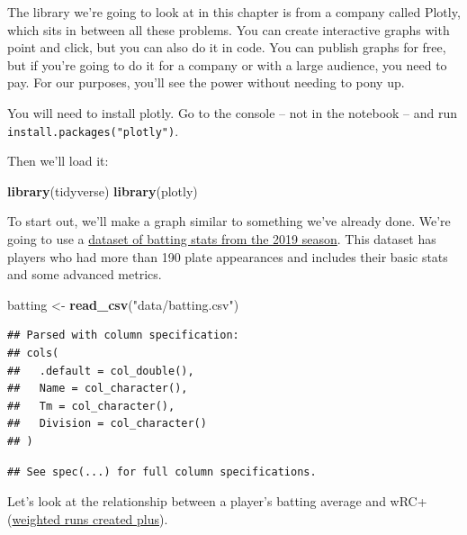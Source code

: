 \documentclass[]{book}
\newenvironment{Shaded}{\begin{snugshade}}{\end{snugshade}}
\newcommand{\KeywordTok}[1]{\textcolor[rgb]{0.13,0.29,0.53}{\textbf{#1}}}
\newcommand{\NormalTok}[1]{#1}
\newcommand{\StringTok}[1]{\textcolor[rgb]{0.31,0.60,0.02}{#1}}
\begin{document}
The library we're going to look at in this chapter is from a company called Plotly, which sits in between all these problems. You can create interactive graphs with point and click, but you can also do it in code. You can publish graphs for free, but if you're going to do it for a company or with a large audience, you need to pay. For our purposes, you'll see the power without needing to pony up.

You will need to install plotly. Go to the console -- not in the notebook -- and run \texttt{install.packages("plotly")}.

Then we'll load it:

\begin{Shaded}
\begin{Highlighting}[]
\KeywordTok{library}\NormalTok{(tidyverse)}
\KeywordTok{library}\NormalTok{(plotly)}
\end{Highlighting}
\end{Shaded}

To start out, we'll make a graph similar to something we've already done. We're going to use a \href{https://unl.box.com/s/xg0eqvmz9ynnegvjabv21ev5qlsd7mjs}{dataset of batting stats from the 2019 season}. This dataset has players who had more than 190 plate appearances and includes their basic stats and some advanced metrics.

\begin{Shaded}
\begin{Highlighting}[]
\NormalTok{batting <-}\StringTok{ }\KeywordTok{read_csv}\NormalTok{(}\StringTok{"data/batting.csv"}\NormalTok{)}
\end{Highlighting}
\end{Shaded}

\begin{verbatim}
## Parsed with column specification:
## cols(
##   .default = col_double(),
##   Name = col_character(),
##   Tm = col_character(),
##   Division = col_character()
## )
\end{verbatim}

\begin{verbatim}
## See spec(...) for full column specifications.
\end{verbatim}

Let's look at the relationship between a player's batting average and wRC+ (\href{http://m.mlb.com/glossary/advanced-stats/weighted-runs-created-plus}{weighted runs created plus}).
\end{document}
